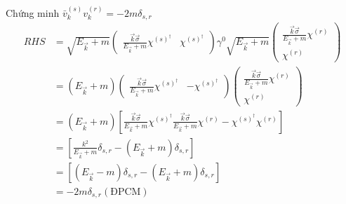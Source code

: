 \documentclass{article}
\begin{document}
Chứng minh $\bar{v}_{k}^{(s)} v^{(r)}_{k} = -2m\delta_{s,r} $
\begin{align*}
	RHS 
	& =
	\sqrt{E_{\vec{k}} + m }
	\begin{pmatrix}
		\frac{\vec{k}\vec{\sigma}}{E_{\vec{k}} + m } \chi^{(s)^{\dagger} } & \chi^{(s)^{\dagger} }
	\end{pmatrix}\gamma^0
	\sqrt{E_{\vec{k}} + m }
	\begin{pmatrix}
		\frac{\vec{k}\vec{\sigma}}{E_{\vec{k}} + m } \chi^{(r)} \\
		\chi^{(r)}
	\end{pmatrix}\\
	&= (E_{\vec{k}}+m)
	\begin{pmatrix}
		\frac{\vec{k}\vec{\sigma}}{E_{\vec{k}} + m } \chi^{(s)^{\dagger} } & -\chi^{(s)^{\dagger} }
	\end{pmatrix}
	\begin{pmatrix}
		\frac{\vec{k}\vec{\sigma}}{E_{\vec{k}} + m } \chi^{(r)} \\
		\chi^{(r)}
	\end{pmatrix}\\
	& = (E_{\vec{k}}+m)
		\left[\frac{\vec{k}\vec{\sigma}}{E_{\vec{k}} + m } \chi^{(s)^{\dagger}}\frac{\vec{k}\vec{\sigma}}{E_{\vec{k}} + m } \chi^{(r)} -\chi^{(s)^{\dagger}} \chi^{(r)}\right] \\
	& = \left[ \frac{k^2}{E_{\vec{k}} + m}\delta_{s,r} - (E_{\vec{k}} + m)\delta_{s,r}\right] \\
	& = \left[ (E_{\vec{k}} - m)\delta_{s,r} - (E_{\vec{k}} + m)\delta_{s,r}\right] \\
	& = -2m \delta_{s,r} (\text{ĐPCM}) \\
\end{align*}
\end{document}
